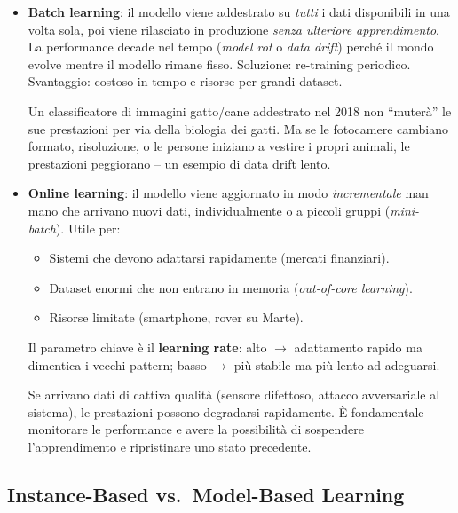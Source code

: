 \begin{itemize}
    \item \textbf{Batch learning}: il modello viene addestrato su \emph{tutti} i dati disponibili in una volta sola, poi viene rilasciato in produzione \emph{senza ulteriore apprendimento}. La performance decade nel tempo (\emph{model rot} o \emph{data drift}) perché il mondo evolve mentre il modello rimane fisso. Soluzione: re-training periodico. Svantaggio: costoso in tempo e risorse per grandi dataset.

    \begin{exbox}
        Un classificatore di immagini gatto/cane addestrato nel 2018 non ``muterà'' le sue prestazioni per via della biologia dei gatti. Ma se le fotocamere cambiano formato, risoluzione, o le persone iniziano a vestire i propri animali, le prestazioni peggiorano -- un esempio di data drift lento.
    \end{exbox}

    \item \textbf{Online learning}: il modello viene aggiornato in modo \emph{incrementale} man mano che arrivano nuovi dati, individualmente o a piccoli gruppi (\emph{mini-batch}). Utile per:
    \begin{itemize}
        \item Sistemi che devono adattarsi rapidamente (mercati finanziari).
        \item Dataset enormi che non entrano in memoria (\emph{out-of-core learning}).
        \item Risorse limitate (smartphone, rover su Marte).
    \end{itemize}
    Il parametro chiave è il \textbf{learning rate}: alto $\to$ adattamento rapido ma dimentica i vecchi pattern; basso $\to$ più stabile ma più lento ad adeguarsi.

    \begin{warnbox}
        Se arrivano dati di cattiva qualità (sensore difettoso, attacco avversariale al sistema), le prestazioni possono degradarsi rapidamente. È fondamentale monitorare le performance e avere la possibilità di sospendere l'apprendimento e ripristinare uno stato precedente.
    \end{warnbox}
\end{itemize}

\subsection{Instance-Based vs.\ Model-Based Learning}

